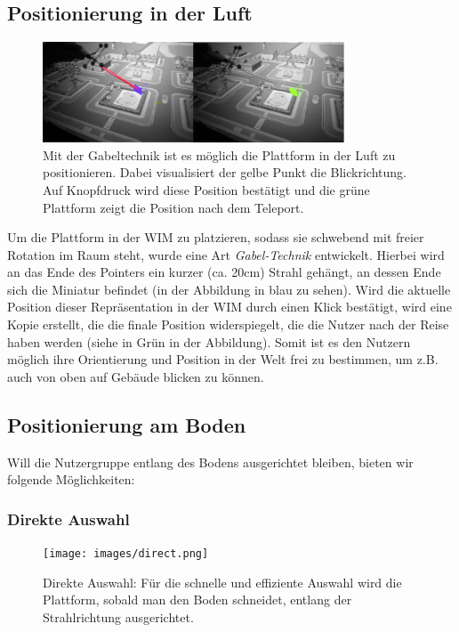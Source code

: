 \subsection{Positionierung in der Luft}

\begin{figure}[h!]
  \centering
  \includegraphics[width=0.8\textwidth]{images/fork.png}
  \caption{Mit der Gabeltechnik ist es möglich die Plattform in der Luft zu positionieren. Dabei visualisiert der gelbe Punkt die Blickrichtung. Auf Knopfdruck wird diese Position bestätigt und die grüne Plattform zeigt die Position nach dem Teleport.}
  \label{fig:todo}
\end{figure}


Um die Plattform in der WIM zu platzieren, sodass sie schwebend mit freier Rotation im Raum steht, wurde eine Art \textit{Gabel-Technik} entwickelt. Hierbei wird an das Ende des Pointers ein kurzer (ca. 20cm) Strahl gehängt, an dessen Ende sich die Miniatur befindet (in der Abbildung in blau zu sehen). Wird die aktuelle Position dieser Repräsentation in der WIM durch einen Klick bestätigt, wird eine Kopie erstellt, die die finale Position widerspiegelt, die die Nutzer nach der Reise haben werden (siehe in Grün in der Abbildung).
Somit ist es den Nutzern möglich ihre Orientierung und Position in der Welt frei zu bestimmen, um z.B. auch von oben auf Gebäude blicken zu können.


\subsection{Positionierung am Boden}
Will die Nutzergruppe entlang des Bodens ausgerichtet bleiben, bieten wir folgende Möglichkeiten:

\subsubsection{Direkte Auswahl}

\begin{figure}[h]
  \centering
  \texttt{[image: images/direct.png]}
  \caption{Direkte Auswahl: Für die schnelle und effiziente Auswahl wird die Plattform, sobald man den Boden schneidet, entlang der Strahlrichtung ausgerichtet.}
  \label{fig:todo}
\end{figure}

